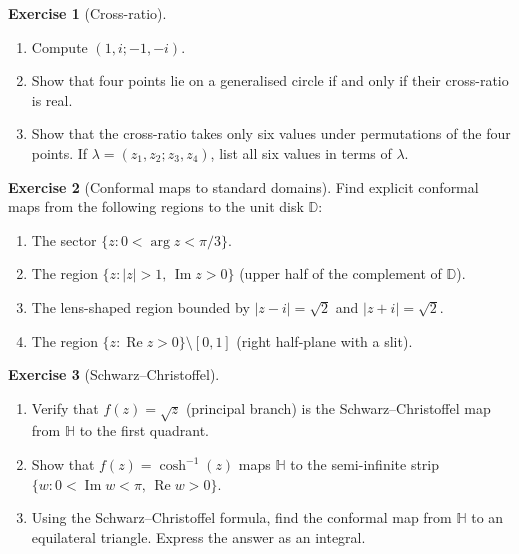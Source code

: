 \documentclass[12pt,a4paper,openany]{book}
\theoremstyle{definition}
\newtheorem{exercise}{Exercise}[chapter]
\theoremstyle{plain}
\theoremstyle{remark}
\newcommand{\D}{\mathbb{D}}
\DeclareMathOperator{\re}{Re}
\DeclareMathOperator{\im}{Im}
\newcommand{\abs}[1]{\left|#1\right|}
\begin{document}
\begin{exercise}[Cross-ratio]\label{exer:cross-ratio}
\begin{enumerate}[label=(\alph*)]
  \item Compute $(1,i;-1,-i)$.
  \item Show that four points lie on a generalised circle if and only if
        their cross-ratio is real.
  \item Show that the cross-ratio takes only six values under
        permutations of the four points.  If $\lambda=(z_1,z_2;z_3,z_4)$,
        list all six values in terms of $\lambda$.
\end{enumerate}
\end{exercise}

\begin{exercise}[Conformal maps to standard domains]\label{exer:conf-standard}
Find explicit conformal maps from the following regions to the unit disk
$\D$:
\begin{enumerate}[label=(\alph*)]
  \item The sector $\{z:0<\arg z<\pi/3\}$.
  \item The region $\{z:\abs{z}>1,\,\im z>0\}$
        (upper half of the complement of $\D$).
  \item The lens-shaped region bounded by $\abs{z-i}=\sqrt{2}$ and
        $\abs{z+i}=\sqrt{2}$.
  \item The region $\{z:\re z>0\}\setminus[0,1]$
        (right half-plane with a slit).
\end{enumerate}
\end{exercise}

\begin{exercise}[Schwarz--Christoffel]\label{exer:sc}
\begin{enumerate}[label=(\alph*)]
  \item Verify that $f(z)=\sqrt{z}$ (principal branch) is the
        Schwarz--Christoffel map from $\mathbb{H}$ to the first
        quadrant.
  \item Show that $f(z)=\cosh^{-1}(z)$ maps $\mathbb{H}$ to the
        semi-infinite strip $\{w:0<\im w<\pi,\,\re w>0\}$.
  \item Using the Schwarz--Christoffel formula, find the conformal map
        from $\mathbb{H}$ to an equilateral triangle.  Express the
        answer as an integral.
\end{enumerate}
\end{exercise}
\end{document}
